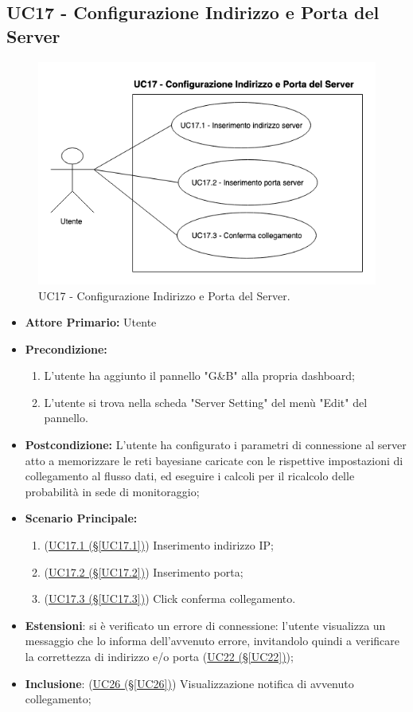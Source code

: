 \subsection{UC17 - Configurazione Indirizzo e Porta del Server}\label{UC17}
\begin{figure}[H]
	\centering
	\includegraphics[scale=0.65]{./images/UC17.png}
	\caption{UC17 - Configurazione Indirizzo e Porta del Server.}
\end{figure}
\begin{itemize}
	\item \textbf{Attore Primario:}  Utente
	\item \textbf{Precondizione:}
		\begin{enumerate}
			\item L'utente ha aggiunto il pannello "G\&B" alla propria dashboard;
			\item L'utente si trova nella scheda "Server Setting" del menù "Edit" del pannello.
		\end{enumerate}
	\item \textbf{Postcondizione:} L'utente ha configurato i parametri di connessione al server atto a memorizzare le reti bayesiane caricate con le rispettive impostazioni di collegamento al flusso dati, ed eseguire i calcoli per il ricalcolo delle probabilità in sede di monitoraggio;
	\item \textbf{Scenario Principale:}
	\begin{enumerate}
		\item (\hyperref[UC17.1]{UC17.1 (§\ref*{UC17.1})}) Inserimento indirizzo IP;
		\item (\hyperref[UC17.2]{UC17.2 (§\ref*{UC17.2})}) Inserimento porta;
		\item (\hyperref[UC17.3]{UC17.3 (§\ref*{UC17.3})}) Click conferma collegamento.
	\end{enumerate}
	\item \textbf{Estensioni}: si è verificato un errore di connessione: l'utente visualizza un messaggio che lo informa dell'avvenuto errore, invitandolo quindi a verificare la correttezza di indirizzo e/o porta (\hyperref[UC22]{UC22 (§\ref*{UC22})});
	\item  \textbf{Inclusione}: (\hyperref[UC26]{UC26 (§\ref*{UC26})}) Visualizzazione notifica di avvenuto collegamento;
\end{itemize}

